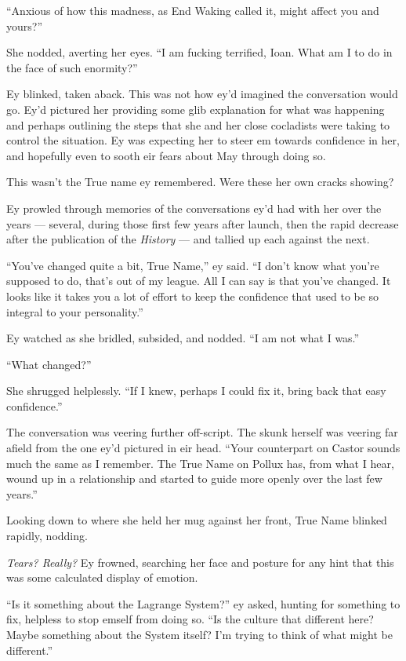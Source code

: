 ``Anxious of how this madness, as End Waking called it, might affect you and yours?''

She nodded, averting her eyes. ``I am fucking terrified, Ioan. What am I to do in the face of such enormity?''

Ey blinked, taken aback. This was not how ey'd imagined the conversation would go. Ey'd pictured her providing some glib explanation for what was happening and perhaps outlining the steps that she and her close cocladists were taking to control the situation. Ey was expecting her to steer em towards confidence in her, and hopefully even to sooth eir fears about May through doing so.

This wasn't the True name ey remembered. Were these her own cracks showing?

Ey prowled through memories of the conversations ey'd had with her over the years — several, during those first few years after launch, then the rapid decrease after the publication of the \emph{History} — and tallied up each against the next.

``You've changed quite a bit, True Name,'' ey said. ``I don't know what you're supposed to do, that's out of my league. All I can say is that you've changed. It looks like it takes you a lot of effort to keep the confidence that used to be so integral to your personality.''

Ey watched as she bridled, subsided, and nodded. ``I am not what I was.''

``What changed?''

She shrugged helplessly. ``If I knew, perhaps I could fix it, bring back that easy confidence.''

The conversation was veering further off-script. The skunk herself was veering far afield from the one ey'd pictured in eir head. ``Your counterpart on Castor sounds much the same as I remember. The True Name on Pollux has, from what I hear, wound up in a relationship and started to guide more openly over the last few years.''

Looking down to where she held her mug against her front, True Name blinked rapidly, nodding.

\emph{Tears? Really?} Ey frowned, searching her face and posture for any hint that this was some calculated display of emotion.

``Is it something about the Lagrange System?'' ey asked, hunting for something to fix, helpless to stop emself from doing so. ``Is the culture that different here? Maybe something about the System itself? I'm trying to think of what might be different.''

